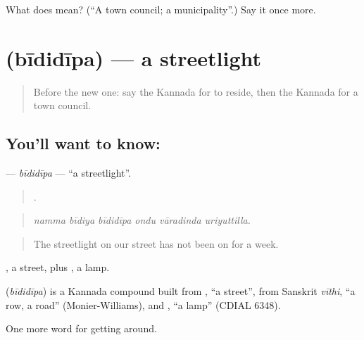 \begin{tcolorbox}[breakable,colback=teal!4,colframe=teal!35!black,title={Before you move on}]
What does  mean? (\textquotedblleft{}A town council; a municipality\textquotedblright{}.) Say it once more.
\end{tcolorbox}
\section[\texorpdfstring{\kn{ಬೀದಿದೀಪ} (bīdidīpa)}{ಬೀದಿದೀಪ (bīdidīpa)}]{ (bīdidīpa) — a streetlight}

\label{lesson:KA-C466-bididipa}



\begin{quote}
Before the new one: say the Kannada for to reside, then the Kannada for a town council.
\end{quote}

\subsection*{You'll want to know: }
\textbf{} — \emph{bīdidīpa} — \textquotedblleft{}a streetlight\textquotedblright{}.

\begin{quote}
     .
\end{quote}

\begin{quote}
\emph{namma bīdiya bīdidīpa ondu vāradinda uriyuttilla.}
\end{quote}

\begin{quote}
The streetlight on our street has not been on for a week.
\end{quote}

, a street, plus , a lamp.

\begin{cousinweb}
\textbf{} (\emph{bīdidīpa}) is a Kannada compound built from , \textquotedblleft{}a street\textquotedblright{}, from Sanskrit \emph{vīthi}, \textquotedblleft{}a row, a road\textquotedblright{} (Monier-Williams), and , \textquotedblleft{}a lamp\textquotedblright{} (CDIAL 6348).
\end{cousinweb}

\begin{grammarlens}[title={What you've built}]
One more word for getting around.
\end{grammarlens}

